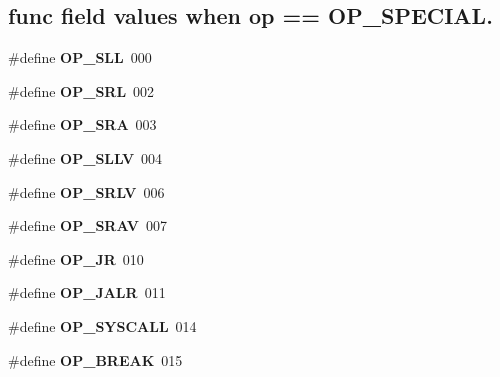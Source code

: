 \subsection*{\textquotesingle{}func\textquotesingle{} field values when \textquotesingle{}op\textquotesingle{} == O\+P\+\_\+\+S\+P\+E\+C\+I\+AL.}
\begin{DoxyCompactItemize}
\item 
\mbox{\label{group__mips__ops_gadc75fe5a64beba40c47732fdcce6ae61}} 
\#define {\bfseries O\+P\+\_\+\+S\+LL}~000
\item 
\mbox{\label{group__mips__ops_ga536e03b9cc8fa87632a6c1079fe0cbe3}} 
\#define {\bfseries O\+P\+\_\+\+S\+RL}~002
\item 
\mbox{\label{group__mips__ops_ga8bbb6a86f3f15b03c95a586fc4b592c0}} 
\#define {\bfseries O\+P\+\_\+\+S\+RA}~003
\item 
\mbox{\label{group__mips__ops_gad70337f40cd966b0b3e9509477a608ac}} 
\#define {\bfseries O\+P\+\_\+\+S\+L\+LV}~004
\item 
\mbox{\label{group__mips__ops_ga7fdea0bf519100fcc0626f76a904923a}} 
\#define {\bfseries O\+P\+\_\+\+S\+R\+LV}~006
\item 
\mbox{\label{group__mips__ops_ga090e1503ff891c6b299ba0029e073dae}} 
\#define {\bfseries O\+P\+\_\+\+S\+R\+AV}~007
\item 
\mbox{\label{group__mips__ops_gab06ef872de3d15ec7c9c63d8a4726fe9}} 
\#define {\bfseries O\+P\+\_\+\+JR}~010
\item 
\mbox{\label{group__mips__ops_gac3a204cab31fee6f9a12aa5642897d0b}} 
\#define {\bfseries O\+P\+\_\+\+J\+A\+LR}~011
\item 
\mbox{\label{group__mips__ops_ga0fffbf39d913537d805e497a6e75bb8e}} 
\#define {\bfseries O\+P\+\_\+\+S\+Y\+S\+C\+A\+LL}~014
\item 
\mbox{\label{group__mips__ops_ga08f499e179ee9a04555219003fa9643d}} 
\#define {\bfseries O\+P\+\_\+\+B\+R\+E\+AK}~015

\end{DoxyCompactItemize}
